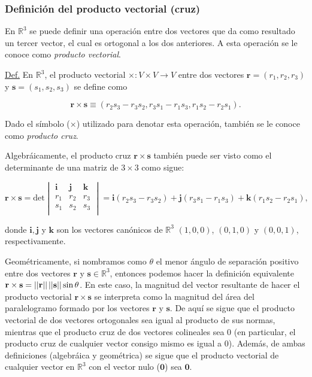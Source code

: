 \documentclass[12pt]{article}
\begin{document}
\subsubsection{Definición del producto vectorial (cruz)} \label{Def:Producto_vectorial}

En $\mathbb{R}^3$ se puede definir una operación entre dos vectores que da como resultado un tercer vector, el cual es ortogonal a los dos anteriores. A esta operación se le conoce como \emph{producto vectorial}.

\begin{tcolorbox}
\underline{Def.} En $\mathbb{R}^3$, el producto vectorial $\times:V\times V \rightarrow V$ entre dos vectores $\mathbf{r}=(r_1,r_2,r_3)$ y $\mathbf{s}=(s_1,s_2,s_3)$ se define como

$$\mathbf{r}\times\mathbf{s} \equiv (r_2s_3-r_3s_2,r_3s_1-r_1s_3,r_1s_2-r_2s_1).$$

\noindent Dado el símbolo ($\times$) utilizado para denotar esta operación, también se le conoce como \emph{producto cruz}.
\end{tcolorbox}{}

Algebráicamente, el producto cruz $\mathbf{r}\times\mathbf{s}$ también puede ser visto como el determinante de una matriz de $3\times3$ como sigue:

$$\mathbf{r}\times\mathbf{s} = \text{det} \begin{vmatrix} \mathbf{i}&\mathbf{j}&\mathbf{k} \\ r_1&r_2&r_3 \\ s_1&s_2&s_3 \\
\end{vmatrix} = \mathbf{i}(r_2s_3-r_3s_2)+\mathbf{j}(r_3s_1-r_1s_3)+\mathbf{k}(r_1s_2-r_2s_1),$$

\noindent donde $\mathbf{i},\mathbf{j}$ y $\mathbf{k}$ son los vectores canónicos de $\mathbb{R}^3$ $(1,0,0)$, $(0,1,0)$ y $(0,0,1)$, respectivamente.

Geométricamente, si nombramos como $\theta$ el menor ángulo de separación positivo entre dos vectores $\mathbf{r}$ y $\mathbf{s}\in\mathbb{R}^3$, entonces podemos hacer la definición equivalente $\mathbf{r}\times\mathbf{s}=||\mathbf{r}|| \hspace{0.5mm}  ||\mathbf{s}||\sin\theta$. En este caso, la magnitud del vector resultante de hacer el producto vectorial $\mathbf{r}\times\mathbf{s}$ se interpreta como la magnitud del área del paralelogramo formado por los vectores $\mathbf{r}$ y $\mathbf{s}$. De aquí se sigue que el producto vectorial de dos vectores ortogonales sea igual al producto de sus normas, mientras que el producto cruz de dos vectores colineales sea $0$ (en particular, el producto cruz de cualquier vector consigo mismo es igual a $0$). Además, de ambas definiciones (algebráica y geométrica) se sigue que el producto vectorial de cualquier vector en $\mathbb{R}^3$ con el vector nulo ($\mathbf{0}$) sea $\mathbf{0}$.
\end{document}

